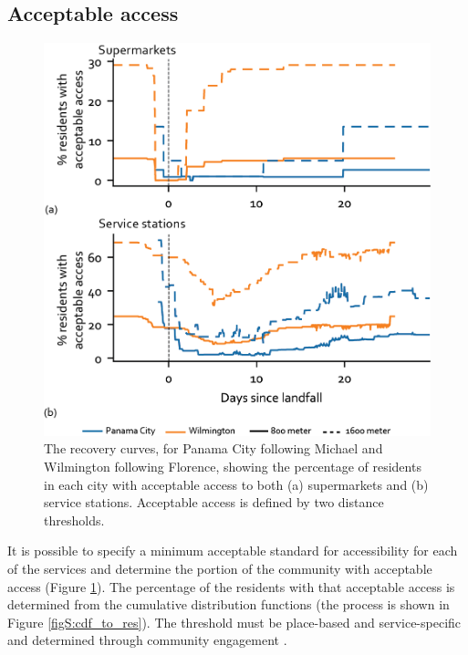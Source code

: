 \documentclass[onecolumn,doublespacing]{risa}
\let \cite \parencite
\begin{document}
\subsection{Acceptable access}
\begin{figure}
    \centering
    \includegraphics[width=\linewidth]{report/fig/sufficient_only.png}
    \caption{The recovery curves, for Panama City following Michael and Wilmington following Florence, showing the percentage of residents in each city with acceptable access to both (a) supermarkets and (b) service stations. Acceptable access is defined by two distance thresholds. 
    }
    \label{fig:threshold}
\end{figure}

It is possible to specify a minimum acceptable standard for accessibility for each of the services and determine the portion of the community with acceptable access (Figure \ref{fig:threshold}). 
The percentage of the residents with that acceptable access is determined from the cumulative distribution functions (the process is shown in Figure \ref{figS:cdf_to_res}). 
The threshold must be place-based and service-specific and determined through community engagement \cite{Pantelic1991-qu, United_Nations_Educational_Scientific_and_Cultural_Organization2018-sf}.
\end{document}
